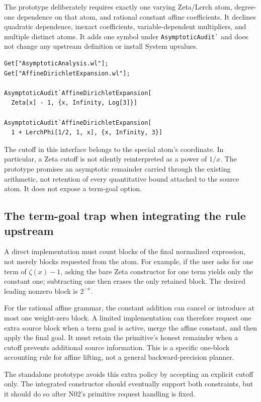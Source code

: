 \documentclass[11pt,letterpaper]{article}
\newcommand{\code}[1]{\nolinkurl{#1}}
\begin{document}
The prototype deliberately requires exactly one varying Zeta/Lerch atom,
degree-one dependence on that atom, and rational constant affine coefficients.
It declines quadratic dependence, inexact coefficients, variable-dependent
multipliers, and multiple distinct atoms. It adds one symbol under
\code{AsymptoticAudit`} and does not change any upstream definition or install
System upvalues.

\begin{lstlisting}
Get["AsymptoticAnalysis.wl"];
Get["AffineDirichletExpansion.wl"];

AsymptoticAudit`AffineDirichletExpansion[
  Zeta[x] - 1, {x, Infinity, Log[3]}]

AsymptoticAudit`AffineDirichletExpansion[
  1 + LerchPhi[1/2, 1, x], {x, Infinity, 3}]
\end{lstlisting}
The cutoff in this interface belongs to the special atom's coordinate. In
particular, a Zeta cutoff is not silently reinterpreted as a power of $1/x$.
The prototype promises an asymptotic remainder carried through the existing
arithmetic, not retention of every quantitative bound attached to the source
atom. It does not expose a term-goal option.

\subsection{The term-goal trap when integrating the rule upstream}
A direct implementation must count blocks of the final normalized expression,
not merely blocks requested from the atom. For example, if the user asks for
one term of $\zeta(x)-1$, asking the bare Zeta constructor for one term yields
only the constant one; subtracting one then erases the only retained block.
The desired leading nonzero block is $2^{-x}$.

For the rational affine grammar, the constant addition can cancel or introduce
at most one weight-zero block. A limited implementation can therefore request
one extra source block when a term goal is active, merge the affine constant,
and then apply the final goal. It must retain the primitive's honest remainder
when a cutoff prevents additional source information. This is a specific
one-block accounting rule for affine lifting, not a general backward-precision
planner.

The standalone prototype avoids this extra policy by accepting an explicit
cutoff only. The integrated constructor should eventually support both
constraints, but it should do so after N02's primitive request handling is fixed.
\end{document}
